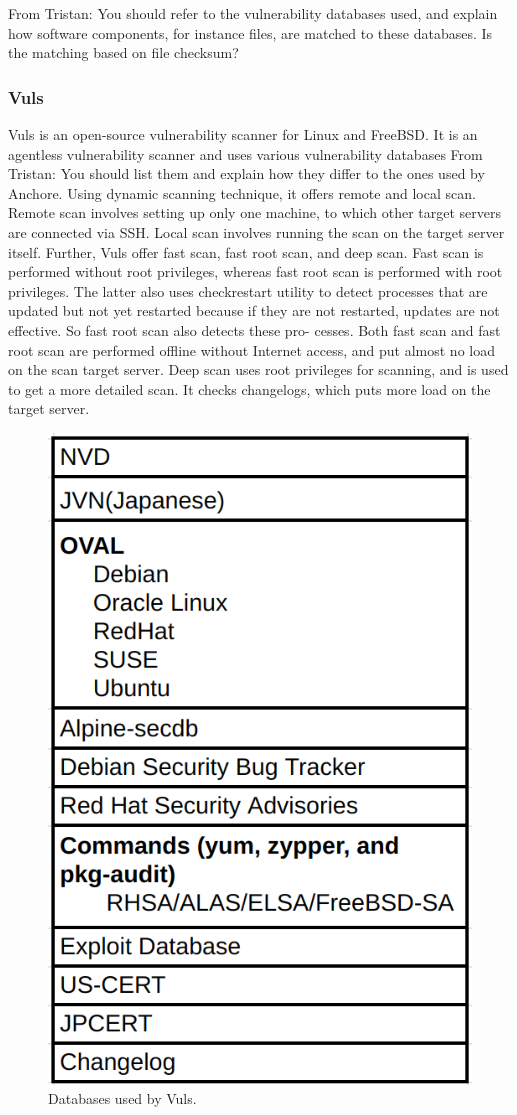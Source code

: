 \documentclass[a4paper,num-refs]{oup-contemporary}
\newcommand{\TG}[1]{\color{blue}From Tristan: #1\color{black}}
\begin{document}
\TG{You should refer to the vulnerability databases used, and explain how
software components, for instance files, are matched to these databases. Is
the matching based on file checksum?}

\subsubsection{Vuls}

Vuls is an open-source vulnerability scanner for Linux and FreeBSD.
It is an agentless vulnerability scanner and uses various
vulnerability databases \TG{You should list them and explain how they differ to 
the ones used by Anchore}. Using dynamic scanning technique, it offers
remote and local scan. Remote scan involves setting up only one machine, to
which other target servers are connected via SSH. Local scan involves running
the scan on the target server itself. Further, Vuls offer fast scan, fast root scan,
and deep scan.
Fast scan is performed without root privileges, whereas fast root scan is
performed with root privileges. The latter also uses checkrestart utility to 
detect processes that are updated but not yet restarted because if they are not
restarted, updates are not effective. So fast root scan also detects these pro-
cesses. Both fast scan and fast root scan are performed offline without Internet
access, and put almost no load on the scan target server. Deep scan uses
root privileges for scanning, and is used to get a more detailed scan. It checks
changelogs, which puts more load on the target server.

\begin{figure}
  \centering
  \includegraphics[width=.7\columnwidth]{Figures/vuls.png}
  \caption{Databases used by Vuls.}
	\label{fig:vuls_db}
\end{figure}
\end{document}

